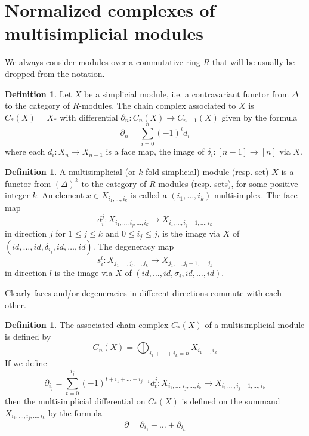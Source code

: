 \documentclass[a4paper,11pt]{article}
\theoremstyle{remark}
\theoremstyle{definition}
\newtheorem{definition}[theorem]{Definition}
\begin{document}
\section{Normalized complexes of multisimplicial modules}
We always consider modules over a commutative ring $R$ that will be usually be dropped from the notation. 

\begin{definition}	
Let $X$ be a simplicial module, i.e. a contravariant functor from $\Delta$ to the category of $R$-modules.
The chain complex associated to $X$ is $C_{*}(X)=X_*$
with differential $\partial_{n}:C_{n}(X) \rightarrow C_{n-1}(X)$ given by the formula 
	\begin{equation*}
	\partial_{n}= \sum_{i=0}^{n} (-1)^{i} d_{i}
	\end{equation*}
where each $d_{i}:X_n \to X_{n-1}$ is a  face map, the image of $\delta_{i}:[n-1] \to [n]$ via $X$.
\end{definition}

\begin{definition}
A multisimplicial (or $k$-fold simplicial) module (resp. set) $X$ is a functor from $(\Delta)^{k}$ to the category of $R$-modules (resp. sets), for some positive integer $k$. An element $x \in X_{i_1,\dots,i_k}$ is called a $(i_1,\dots,i_k)$-multisimplex. 
The face map 
$$d_i^j:X_{i_1,\dots,i_j,\dots,i_k} \to X_{i_1,\dots,i_j-1,\dots,i_k}$$ in direction $j$ for $1 \leq j \leq k$
and $0 \leq i_j \leq j$, is the image via $X$ of $(id,\dots,id, \delta_{i_j},id, \dots,id)$. The degeneracy map $$s^l_i:X_{j_1,\dots,j_l, \dots,j_k} \to X_{j_1,\dots,j_l+1,\dots,j_k}$$ in direction $l$ is the image via $X$ of $(id, \dots,id,\sigma_i,id,\dots,id)$.
\end{definition}
 Clearly faces and/or degeneracies in different directions commute with each other.



\begin{definition}
The associated chain complex $C_{*}(X)$ of a multisimplicial module is defined by
	\begin{equation*}
	C_{n}(X)= \bigoplus_{i_{1}+\dots +i_{k}=n}X_{i_{1},\dots,i_{k}}
	\end{equation*}
If we define
	\begin{equation*}
	\partial_{i_{j}}=\sum_{t=0}^{i_{j}} (-1)^{t+i_{1}+\dots+i_{j-1}}d^j_{t}: X_{i_{1},\dots,i_{j},\dots,i_{k}}\rightarrow X_{i_{1},\dots,i_{j}-1,\dots,i_{k}}
	\end{equation*}
then the multisimplicial differential on $C_{*}(X)$ is defined 
on the summand $X_{i_{1},\dots,i_{j},\dots,i_{k}}$
by the formula 
	\begin{equation*}
	\label{differenziale}
	\partial = \partial_{i_{1}}+\dots+\partial_{i_{k}}
	\end{equation*}
\end{definition}
\end{document}

